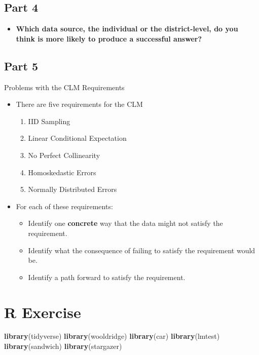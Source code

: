 \documentclass[
]{book}
\newenvironment{Shaded}{\begin{snugshade}}{\end{snugshade}}
\newcommand{\FunctionTok}[1]{\textcolor[rgb]{0.13,0.29,0.53}{\textbf{#1}}}
\newcommand{\NormalTok}[1]{#1}
\providecommand{\tightlist}{%
  \setlength{\itemsep}{0pt}\setlength{\parskip}{0pt}}
\theoremstyle{definition}
\theoremstyle{definition}
\theoremstyle{definition}
\theoremstyle{definition}
\theoremstyle{remark}
\begin{document}
\subsection{Part 4}\label{part-4}

\begin{itemize}
\tightlist
\item
  \textbf{Which data source, the individual or the district-level, do you think is more likely to produce a successful answer?}
\end{itemize}

\subsection{Part 5}\label{part-5}

Problems with the CLM Requirements

\begin{itemize}
\item
  There are five requirements for the CLM

  \begin{enumerate}
  \def\labelenumi{\arabic{enumi}.}
  \tightlist
  \item
    IID Sampling
  \item
    Linear Conditional Expectation
  \item
    No Perfect Collinearity
  \item
    Homoskedastic Errors
  \item
    Normally Distributed Errors
  \end{enumerate}
\item
  For each of these requirements:

  \begin{itemize}
  \tightlist
  \item
    Identify one \textbf{concrete} way that the data might not satisfy the requirement.
  \item
    Identify what the consequence of failing to satisfy the requirement would be.
  \item
    Identify a path forward to satisfy the requirement.
  \end{itemize}
\end{itemize}

\section{R Exercise}\label{r-exercise-3}

\begin{Shaded}
\begin{Highlighting}[]
\FunctionTok{library}\NormalTok{(tidyverse)}
\FunctionTok{library}\NormalTok{(wooldridge)}
\FunctionTok{library}\NormalTok{(car)}
\FunctionTok{library}\NormalTok{(lmtest)}
\FunctionTok{library}\NormalTok{(sandwich)}
\FunctionTok{library}\NormalTok{(stargazer)}
\end{Highlighting}
\end{Shaded}
\end{document}

